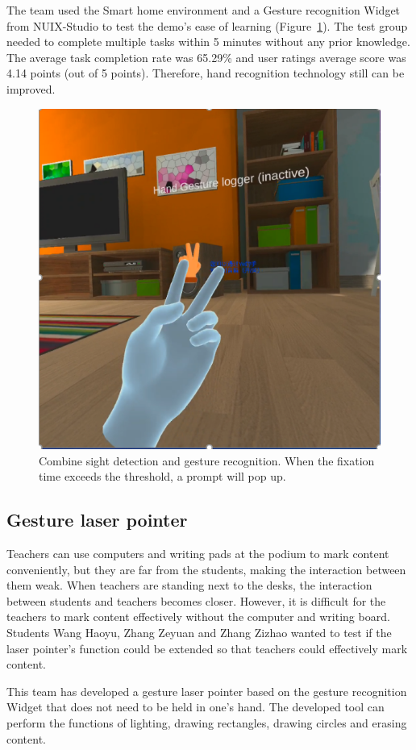 The team used the Smart home environment and a Gesture recognition Widget from NUIX-Studio to test the demo's ease of learning (Figure~\ref{fig:Project7-figure}). The test group needed to complete multiple tasks within 5 minutes without any prior knowledge. The average task completion rate was 65.29\% and user ratings average score was 4.14 points (out of 5 points). Therefore, hand recognition technology still can be improved.

\begin{figure}
  \centering
  \includegraphics[width=0.6\linewidth]{figures/Project_7.png}
  \caption{Combine sight detection and gesture recognition. When the fixation time exceeds the threshold, a prompt will pop up.}
  \label{fig:Project7-figure}
\end{figure}

\subsection{Gesture laser pointer}
Teachers can use computers and writing pads at the podium to mark content conveniently, but they are far from the students, making the interaction between them weak. When teachers are standing next to the desks, the interaction between students and teachers becomes closer. However, it is difficult for the teachers to mark content effectively without the computer and writing board. Students Wang Haoyu, Zhang Zeyuan and Zhang Zizhao wanted to test if the laser pointer's function could be extended so that teachers could effectively mark content.

This team has developed a gesture laser pointer based on the gesture recognition Widget that does not need to be held in one's hand.
The developed tool can perform the functions of lighting, drawing rectangles, drawing circles and erasing content.

